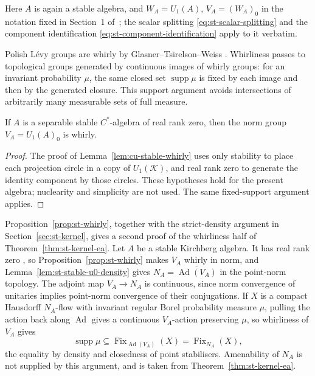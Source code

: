 Here $A$ is again a stable algebra, and $W_A=U_1(A)$, $V_A=(W_A)_0$ in
the notation fixed in Section~1 of~\cite{LupiniStable2026}; the scalar splitting
\eqref{eq:st-scalar-splitting} and the component identification
\eqref{eq:st-component-identification} apply to it verbatim.

Polish L\'evy groups are whirly by Glasner--Tsirelson--Weiss
\cite[Theorem 1.1 and Remark 1.4]{GlasnerTsirelsonWeiss2005}. Whirliness passes to topological
groups generated by continuous images of whirly groups: for an invariant
probability $\mu$, the same closed set $\operatorname{supp}\mu$ is fixed by each image and
then by the generated closure. This support argument avoids intersections of
arbitrarily many measurable sets of full measure.

\begin{proposition}\label{prop:st-whirly}
 If $A$ is a separable stable $C^*$-algebra of real rank
zero, then the norm group $V_A=U_1(A)_0$ is whirly.
\end{proposition}

\begin{proof}
The proof of Lemma~\ref{lem:cu-stable-whirly} uses only stability to
place each projection circle in a copy of \(U_1(\mathcal K)\), and real rank
zero to generate the identity component by those circles. These
hypotheses hold for the present algebra; nuclearity and simplicity
are not used. The same fixed-support argument applies.
\end{proof}

\begin{remark}\label{rem:st-alternative-whirly}
 Proposition~\ref{prop:st-whirly}, together
with the strict-density argument in Section~\ref{sec:st-kernel}, gives a
second proof of the whirliness half of Theorem~\ref{thm:st-kernel-ea}.
Let $A$ be a stable Kirchberg algebra. It has
real rank zero \cite[Theorem~1.2(ii)]{Zhang1992}, so
Proposition~\ref{prop:st-whirly} makes $V_A$ whirly in norm, and
Lemma~\ref{lem:st-stable-u0-density} gives $N_A=\overline{\operatorname{Ad}(V_A)}$ in the
point-norm topology. The adjoint map $V_A\to N_A$ is continuous, since
norm convergence of unitaries implies point-norm convergence of their
conjugations. If $X$ is a compact Hausdorff $N_A$-flow with invariant
regular Borel probability measure $\mu$, pulling the action back along
$\operatorname{Ad}$ gives a continuous $V_A$-action preserving $\mu$, so whirliness of
$V_A$ gives
\begin{equation*}
\operatorname{supp}\mu\subseteq\operatorname{Fix}_{\operatorname{Ad}(V_A)}(X)=\operatorname{Fix}_{N_A}(X),
\end{equation*}
the equality by density and closedness of point stabilisers. Amenability
of $N_A$ is not supplied by this argument, and is taken from
Theorem~\ref{thm:st-kernel-ea}.
\end{remark}

